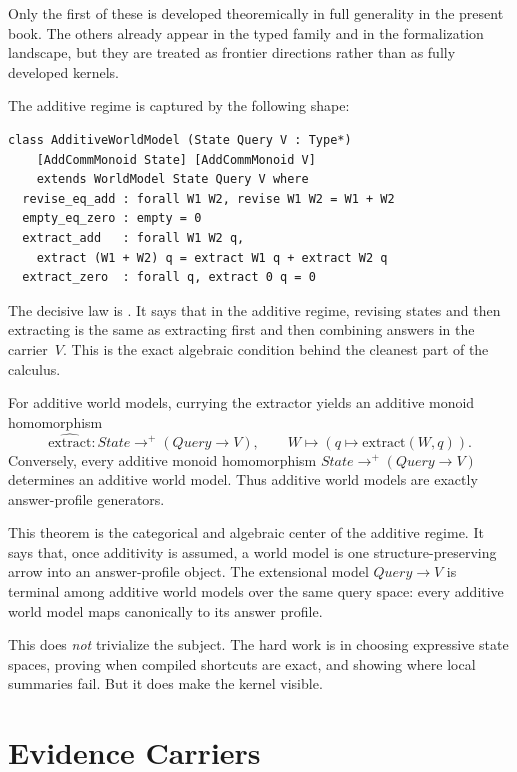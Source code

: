 Only the first of these is developed theoremically in full generality in the
present book.  The others already appear in the typed family and in the
formalization landscape, but they are treated as frontier directions rather than
as fully developed kernels.

The additive regime is captured by the following shape:

\begin{lstlisting}[language={}]
class AdditiveWorldModel (State Query V : Type*)
    [AddCommMonoid State] [AddCommMonoid V]
    extends WorldModel State Query V where
  revise_eq_add : forall W1 W2, revise W1 W2 = W1 + W2
  empty_eq_zero : empty = 0
  extract_add   : forall W1 W2 q,
    extract (W1 + W2) q = extract W1 q + extract W2 q
  extract_zero  : forall q, extract 0 q = 0
\end{lstlisting}

The decisive law is .  It says that in the additive regime,
revising states and then extracting is the same as extracting first and then
combining answers in the carrier~$V$.  This is the exact algebraic condition
behind the cleanest part of the calculus.

\begin{theorem}
\label{thm:overview-profile-hom}
For additive world models, currying the extractor yields an additive monoid
homomorphism
\[
  \widehat{\mathrm{extract}} : \textit{State} \to^+ (\textit{Query} \to V),
  \qquad
  W \mapsto (q \mapsto \mathrm{extract}(W,q)).
\]
Conversely, every additive monoid homomorphism
\(\textit{State} \to^+ (\textit{Query} \to V)\) determines an additive world
model.  Thus additive world models are exactly answer-profile generators.
\end{theorem}

This theorem is the categorical and algebraic center of the additive regime.
It says that, once additivity is assumed, a world model is one
structure-preserving arrow into an answer-profile object.  The extensional
model \(\textit{Query} \to V\) is terminal among additive world models over the
same query space: every additive world model maps canonically to its answer
profile.

This does \emph{not} trivialize the subject.  The hard work is in choosing
expressive state spaces, proving when compiled shortcuts are exact, and
showing where local summaries fail.  But it does make the kernel visible.

\section{Evidence Carriers}
\label{sec:overview-carriers}

